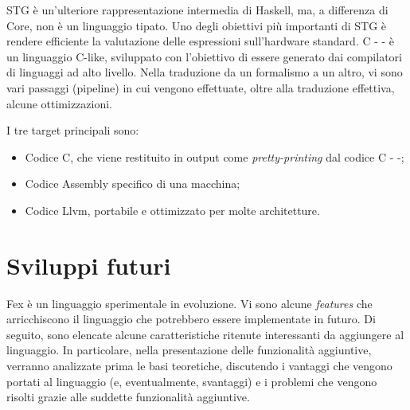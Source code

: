 \documentclass[10pt,a4paper]{article}
\begin{document}
\newline

STG è un'ulteriore rappresentazione intermedia di Haskell, ma, a differenza di Core, non è un linguaggio tipato.
Uno degli obiettivi più importanti di STG è rendere efficiente la valutazione delle espressioni sull'hardware standard.
C - - è un linguaggio C-like, sviluppato con l'obiettivo di essere generato dai compilatori di linguaggi ad alto livello.
Nella traduzione da un formalismo a un altro, vi sono vari passaggi (pipeline) in cui vengono effettuate, oltre alla
traduzione effettiva, alcune ottimizzazioni.

I tre target principali sono:
\begin{itemize}
    \item Codice C, che viene restituito in output come \textit{pretty-printing} dal codice C - -;
    \item Codice Assembly specifico di una macchina;
    \item Codice Llvm, portabile e ottimizzato per molte architetture.
\end{itemize}

\section{Sviluppi futuri}
Fex è un linguaggio sperimentale in evoluzione. Vi sono alcune \textit{features} che arricchiscono il linguaggio che
potrebbero essere implementate in futuro. Di seguito, sono elencate alcune caratteristiche ritenute interessanti da
aggiungere al linguaggio. In particolare, nella presentazione delle funzionalità aggiuntive, verranno analizzate prima le
basi teoretiche, discutendo i vantaggi che vengono portati al linguaggio (e, eventualmente, svantaggi) e i problemi
che vengono risolti grazie alle suddette funzionalità aggiuntive.
\end{document}
